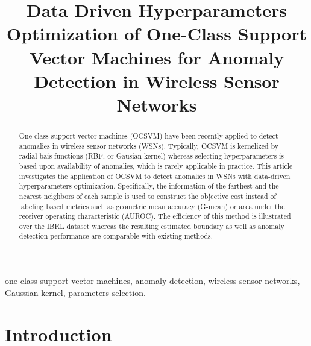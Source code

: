 \documentclass[conference]{IEEEtran}
\begin{document}
\title{Data Driven Hyperparameters Optimization of One-Class Support Vector Machines for Anomaly Detection in Wireless Sensor Networks}

\author{
\and
{}
}

\maketitle

\begin{abstract}
One-class support vector machines (OCSVM) have been recently applied to detect anomalies in wireless sensor networks (WSNs). Typically, OCSVM is kernelized by radial bais functions (RBF, or Gausian kernel) whereas selecting hyperparameters is based upon availability of anomalies, which is rarely applicable in practice. This article investigates the application of OCSVM to detect anomalies in WSNs with data-driven hyperparameters optimization. Specifically, the information of the farthest and the nearest neighbors of each sample is used to construct the objective cost instead of labeling based metrics such as geometric mean accuracy (G-mean) or area under the receiver operating characteristic (AUROC). The efficiency of this method is illustrated over the IBRL dataset whereas the resulting estimated boundary as well as anomaly detection performance are comparable with existing methods. 
\end{abstract}

\begin{IEEEkeywords}
one-class support vector machines,  anomaly detection, wireless sensor networks, Gaussian kernel, parameters selection.
\end{IEEEkeywords}

\IEEEpeerreviewmaketitle

\section{Introduction}
\end{document}
